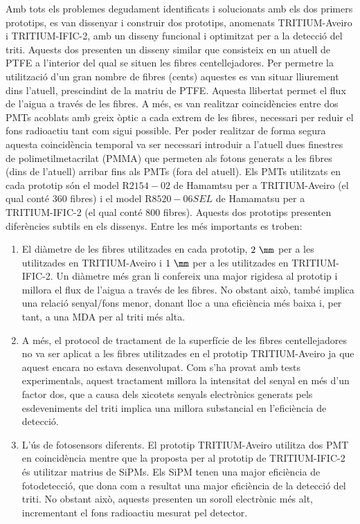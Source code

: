 Amb tots els problemes degudament identificats i solucionats amb els dos primers prototips, es van dissenyar i construir dos prototips, anomenats TRITIUM-Aveiro i TRITIUM-IFIC-2, amb un disseny funcional i optimitzat per a la detecció del triti. Aquests dos presenten un disseny similar que consisteix en un atuell de PTFE a l'interior del qual se situen les fibres centellejadores. Per permetre la utilització d'un gran nombre de fibres (cents) aquestes es van situar lliurement dins l'atuell, prescindint de la matriu de PTFE. Aquesta llibertat permet el flux de l'aigua a través de les fibres. A més, es van realitzar coincidències entre dos PMTs acoblats amb greix òptic a cada extrem de les fibres, necessari per reduir el fons radioactiu tant com sigui possible. Per poder realitzar de forma segura aquesta coincidència temporal va ser necessari introduir a l'atuell dues finestres de polimetilmetacrilat (PMMA) que permeten als fotons generats a les fibres (dins de l'atuell) arribar fins als PMTs (fora del atuell). Els PMTs utilitzats en cada prototip són el model R$2154-02$ de Hamamtsu \cite{DataSheetPMTsAveiro} per a TRITIUM-Aveiro (el qual conté 360 fibres) i el model R$8520-06SEL$ de Hamamatsu \cite{DataSheetPMTs} per a TRITIUM-IFIC-2 (el qual conté 800 fibres). Aquests dos prototips presenten diferències subtils en els dissenys. Entre les més importants es troben:

\begin{enumerate}

\item{} El diàmetre de les fibres utilitzades en cada prototip, $2~\mm$ per a les utilitzades en TRITIUM-Aveiro i $1~\mm$ per a les utilitzades en TRITIUM-IFIC-2. Un diàmetre més gran li confereix una major rigidesa al prototip i millora el flux de l'aigua a través de les fibres. No obstant això, també implica una relació senyal/fons menor, donant lloc a una eficiència més baixa i, per tant, a una MDA per al triti més alta.

\item{} A més, el protocol de tractament de la superfície de les fibres centellejadores no va ser aplicat a les fibres utilitzades en el prototip TRITIUM-Aveiro ja que aquest encara no estava desenvolupat. Com s'ha provat amb tests experimentals, aquest tractament millora la intensitat del senyal en més d'un factor dos, que a causa dels xicotets senyals electrònics generats pels esdeveniments del triti implica una millora substancial en l'eficiència de detecció.


\item{} L'ús de fotosensors diferents. El prototip TRITIUM-Aveiro utilitza dos PMT en coincidència mentre que la proposta per al prototip de TRITIUM-IFIC-2 és utilitzar matrius de SiPMs. Els SiPM tenen una major eficiència de fotodetecció, que dona com a resultat una major eficiència de la detecció del triti. No obstant això, aquests presenten un soroll electrònic més alt, incrementant el fons radioactiu mesurat pel detector. %

\end{enumerate} 


